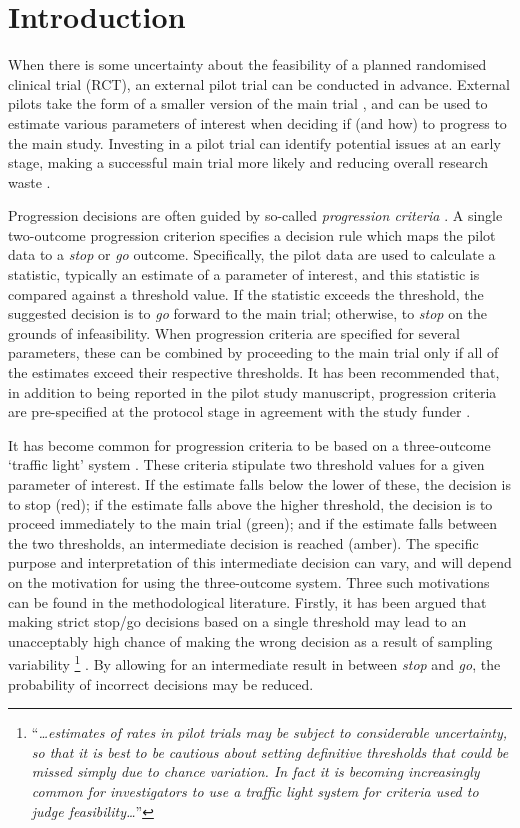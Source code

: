 \documentclass{bmcart}
\begin{document}
\section{Introduction}\label{sec:introduction}

When there is some uncertainty about the feasibility of a planned randomised clinical trial (RCT), an external pilot trial can be conducted in advance. External pilots take the form of a smaller version of the main trial \cite{Eldridge2016}, and can be used to estimate various parameters of interest when deciding if (and how) to progress to the main study. Investing in a pilot trial can identify potential issues at an early stage, making a successful main trial more likely and reducing overall research waste \cite{Morgan2018}.

Progression decisions are often guided by so-called \emph{progression criteria} \cite{Eldridge2016a}. A single two-outcome progression criterion specifies a decision rule which maps the pilot data to a \emph{stop} or \emph{go} outcome. Specifically, the pilot data are used to calculate a statistic, typically an estimate of a parameter of interest, and this statistic is compared against a threshold value. If the statistic exceeds the threshold, the suggested decision is to \emph{go} forward to the main trial; otherwise, to \emph{stop} on the grounds of infeasibility. When progression criteria are specified for several parameters, these can be combined by proceeding to the main trial only if all of the estimates exceed their respective thresholds. It has been recommended that, in addition to being reported in the pilot study manuscript, progression criteria are pre-specified at the protocol stage in agreement with the study funder \cite{NIHR2017, Mbuagbaw2019}.

It has become common for progression criteria to be based on a three-outcome `traffic light' system \cite{Avery2017}. These criteria stipulate two threshold values for a given parameter of interest. If the estimate falls below the lower of these, the decision is to stop (red); if the estimate falls above the higher threshold, the decision is to proceed immediately to the main trial (green); and if the estimate falls between the two thresholds, an intermediate decision is reached (amber). The specific purpose and interpretation of this intermediate decision can vary, and will depend on the motivation for using the three-outcome system. Three such motivations can be found in the methodological literature. Firstly, it has been argued that making strict stop/go decisions based on a single threshold  may lead to an unacceptably high chance of making the wrong decision as a result of sampling variability \footnote{``\emph{\ldots estimates of rates in pilot trials may be subject to considerable uncertainty, so that it is best to be cautious about setting definitive thresholds that could be missed simply due to chance variation. In fact it is becoming increasingly common for investigators to use a traffic light system for criteria used to judge feasibility\ldots}''} \cite{Eldridge2016a}. By allowing for an intermediate result in between \emph{stop} and \emph{go}, the probability of incorrect decisions may be reduced.
\end{document}
